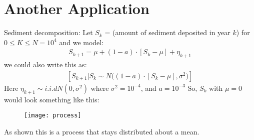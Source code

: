 \documentclass[../../../Master/AppliedStochastics.tex]{subfiles}
\author{Chandler}
\date{05 October 2018}
\begin{document}
%


\makelecture


\section{Another Application}
Sediment decomposition: 
Let $S_{k}$ = (amount of sediment deposited in year $k$) for $0\leq K \leq 
N=10^4$ 
and we model: 
$$\begin{aligned}
S_{k+1} = \mu + (1-a) \cdot [S_{k}-\mu] + \eta_{k+1}
\end{aligned}$$
we could also write this as: 
$$\begin{aligned}
[S_{k+1}\vert S_{k} \sim N\big((1-a) \cdot [S_{k}-\mu], \sigma^2\big)]
\end{aligned}$$
Here $\eta_{k+1} \sim i.i.d N(0, \sigma^{2})$ where $\sigma^{2} = 10^{-4}$, and 
$a=10^{-3}$
So, $S_{k}$ with $\mu=0$ would look something like this: 
\begin{figure}[H]
	\centering
	\texttt{[image: process]}
	\caption*{}
	\label{fig:process}
\end{figure}
As shown this is a process that stays distributed about a mean. 
\end{document}
